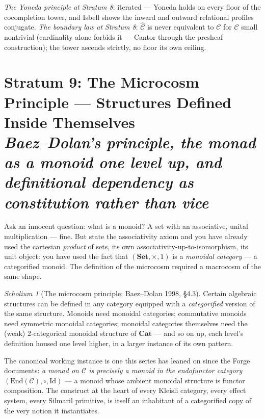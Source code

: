 \documentclass[11pt]{article}
\theoremstyle{plain}
\theoremstyle{definition}
\theoremstyle{remark}
\newtheorem{scholium}[theorem]{Scholium}
\newcommand{\C}{\mathcal{C}}
\newcommand{\Set}{\mathbf{Set}}
\newcommand{\Cat}{\mathbf{Cat}}
\newcommand{\stratum}[2]{\section{#1 \\ {\normalsize\normalfont\itshape #2}}}
\begin{document}
\begin{refrain}
\emph{The Yoneda principle at Stratum 8}: iterated --- Yoneda holds on every floor of the cocompletion tower, and Isbell shows the inward and outward relational profiles conjugate. \emph{The boundary law at Stratum 8}: $\widehat{\C}$ is never equivalent to $\C$ for $\C$ small nontrivial (cardinality alone forbids it --- Cantor through the presheaf construction); the tower ascends strictly, no floor its own ceiling.
\end{refrain}

\stratum{Stratum 9: The Microcosm Principle --- Structures Defined Inside Themselves}{Baez--Dolan's principle, the monad as a monoid one level up, and definitional dependency as constitution rather than vice}

Ask an innocent question: what is a monoid? A set with an associative, unital multiplication --- fine. But state the associativity axiom and you have already used the cartesian \emph{product} of sets, its own associativity-up-to-isomorphism, its unit object: you have used the fact that $(\Set, \times, 1)$ is a \emph{monoidal category} --- a categorified monoid. The definition of the microcosm required a macrocosm of the same shape.

\begin{scholium}[The microcosm principle; Baez--Dolan 1998, \S 4.3]\label{sch:microcosm}
Certain algebraic structures can be defined in any category equipped with a \emph{categorified} version of the same structure. Monoids need monoidal categories; commutative monoids need symmetric monoidal categories; monoidal categories themselves need the (weak) 2-categorical monoidal structure of $\Cat$ --- and so on up, each level's definition housed one level higher, in a larger instance of its own pattern.
\end{scholium}

The canonical working instance is one this series has leaned on since the Forge documents: \emph{a monad on $\C$ is precisely a monoid in the endofunctor category} $(\mathrm{End}(\C), \circ, \mathrm{Id})$ --- a monoid whose ambient monoidal structure is functor composition. The construct at the heart of every Kleisli category, every effect system, every Silmaril primitive, is itself an inhabitant of a categorified copy of the very notion it instantiates.
\end{document}
